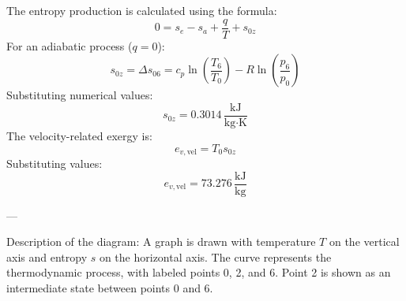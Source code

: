 The entropy production is calculated using the formula:  
\[
0 = s_e - s_a + \frac{q}{T} + s_{0z}
\]  
For an adiabatic process (\( q = 0 \)):  
\[
s_{0z} = \Delta s_{06} = c_p \ln \left( \frac{T_6}{T_0} \right) - R \ln \left( \frac{p_6}{p_0} \right)
\]  
Substituting numerical values:  
\[
s_{0z} = 0.3014 \, \frac{\text{kJ}}{\text{kg·K}}
\]  
The velocity-related exergy is:  
\[
e_{v,\text{vel}} = T_0 s_{0z}
\]  
Substituting values:  
\[
e_{v,\text{vel}} = 73.276 \, \frac{\text{kJ}}{\text{kg}}
\]  

---

Description of the diagram:  
A graph is drawn with temperature \( T \) on the vertical axis and entropy \( s \) on the horizontal axis. The curve represents the thermodynamic process, with labeled points 0, 2, and 6. Point 2 is shown as an intermediate state between points 0 and 6.